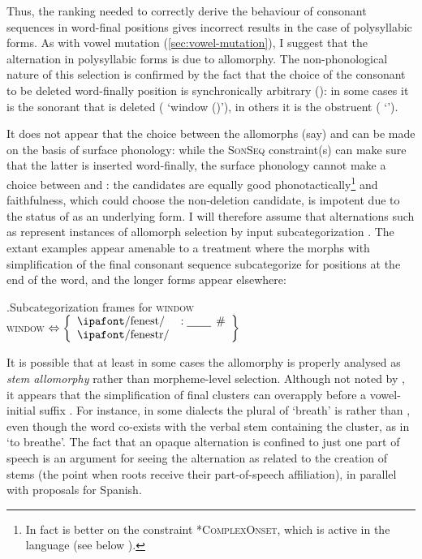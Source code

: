 Thus, the ranking needed to correctly derive the behaviour of consonant sequences in word\hyp final positions gives incorrect results in the case of polysyllabic forms. As with vowel mutation (\cref{sec:vowel-mutation}), I suggest that the alternation in polysyllabic forms is due to allomorphy. The non-phonological nature of this selection is confirmed by the fact that the choice of the consonant to be deleted word\hyp finally position is synchronically arbitrary (): in some cases it is the sonorant that is deleted (\alternation{[ˈfeːnest]}{[feˈnestri]} `window ()'), in others it is the obstruent (\alternation{[ˈaːnal]}{[aˈnadli]} `').

It does not appear that the choice between the allomorphs (say)  and  can be made on the basis of surface phonology: while the \textsc{SonSeq} constraint(s) can make sure that the latter is inserted word-finally, the surface phonology cannot make a choice between \ipa{[feˈnestri]} and \ipa{[feˈnesti]}: the candidates are equally good phonotactically\footnote{In fact \ipa{[feˈnesti]} is better on the constraint *\textsc{ComplexOnset}, which is active in the language (see below ).} and faithfulness, which could choose the non-deletion candidate, is impotent due to the status of  as an underlying form. I will therefore assume that alternations such as \alternation{[ˈfeːnest]}{[feˈnestri]} represent instances of allomorph selection by input subcategorization \citep{paster06:_phonol,bye-allomorphy,yu07}. The extant examples appear amenable to a treatment where the morphs with simplification of the final consonant sequence subcategorize for positions at the end of the word, and the longer forms appear elsewhere:

\ex.Subcategorization frames for \textsc{window}\\
\textsc{window} $\Leftrightarrow\left\{\begin{array}{ll}\mbox{\ipa{/fenest/}}&:\underscore\# \\\mbox{\ipa{/fenestr/}}\end{array}\right\}$

It is possible that at least in some cases the allomorphy is properly analysed as \emph{stem allomorphy} rather than morpheme-level selection. Although not noted by \citet{awbery86:_pembr_welsh}, it appears that the simplification of final clusters can overapply before a vowel\hyp initial suffix \citep{thomas95:_un_fryth,wmffre03:_languag_wales}. For instance, in some dialects the plural of \ipa{[ˈanal]} `breath' is \ipa{[aˈnaːle]} rather than \ipa{[aˈnadle]}, even though the word co\hyp exists with the verbal stem containing the cluster, as in \ipa{[aˈnadli]} `to breathe'. The fact that an opaque alternation is confined to just one part of speech is an argument for seeing the alternation as related to the creation of stems (\ie the point when roots receive their part\hyp of\hyp speech affiliation), in parallel with  proposals for Spanish.

